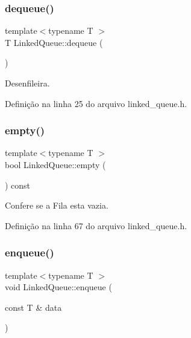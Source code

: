 \mbox{\label{classstructures_1_1_linked_queue_aa4bc66721090abcbd77549fc53694de8}} 
\subsubsection{\texorpdfstring{dequeue()}{dequeue()}}
{\footnotesize\ttfamily template$<$typename T $>$ \\
T Linked\+Queue\+::dequeue (\begin{DoxyParamCaption}{ }\end{DoxyParamCaption})}



Desenfileira. 



Definição na linha 25 do arquivo linked\+\_\+queue.\+h.

\mbox{\label{classstructures_1_1_linked_queue_af956750d6053c0fcb41914615a1a3bfe}} 
\subsubsection{\texorpdfstring{empty()}{empty()}}
{\footnotesize\ttfamily template$<$typename T $>$ \\
bool Linked\+Queue\+::empty (\begin{DoxyParamCaption}{ }\end{DoxyParamCaption}) const}



Confere se a Fila esta vazia. 



Definição na linha 67 do arquivo linked\+\_\+queue.\+h.

\mbox{\label{classstructures_1_1_linked_queue_a5027f4816daee604112244f85f3cac10}} 
\subsubsection{\texorpdfstring{enqueue()}{enqueue()}}
{\footnotesize\ttfamily template$<$typename T $>$ \\
void Linked\+Queue\+::enqueue (\begin{DoxyParamCaption}\item[{const T \&}]{data }\end{DoxyParamCaption})}



